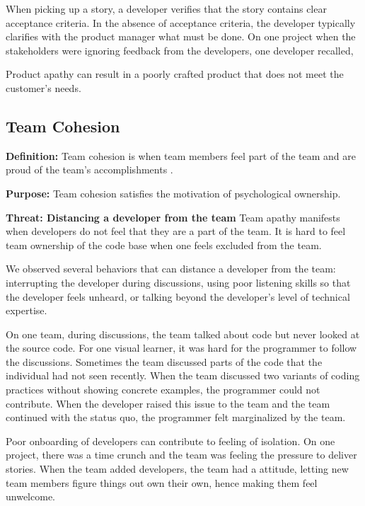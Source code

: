 When picking up a story, a developer verifies that the story contains clear acceptance criteria. In the absence of acceptance criteria, the developer typically clarifies with the product manager what must be done. On one project when the stakeholders were ignoring feedback from the developers, one developer recalled,  

Product apathy can result in a poorly crafted product that does not meet the customer's needs.

\subsection{Team Cohesion}
\textbf{Definition:} Team cohesion is when team members feel part of the team and are proud of the team's accomplishments \cite{Bollen1990Perceived, Beal2003Cohesion, Whitworth2007Motivation}.

\textbf{Purpose:} Team cohesion satisfies the  motivation of psychological ownership.

\textbf{Threat: Distancing a developer from the team} Team apathy manifests when developers do not feel that they are a part of the team. It is hard to feel team ownership of the code base when one feels excluded from the team.

We observed several behaviors that can distance a developer from the team: interrupting the developer during discussions, using poor listening skills so that the developer feels unheard, or talking beyond the developer's level of technical expertise. 

On one team, during discussions, the team talked about code but never looked at the source code. For one visual learner, it was hard for the programmer to follow the discussions. Sometimes the team discussed parts of the code that the individual had not seen recently. When the team discussed two variants of coding practices without showing concrete examples, the programmer could not contribute. When the developer raised this issue to the team and the team continued with the status quo, the programmer felt marginalized by the team.

Poor onboarding of developers can contribute to feeling of isolation. On one project, there was a time crunch and the team was feeling the pressure to deliver stories. When the team added developers, the team had a  attitude, letting new team members figure things out own their own, hence making them feel unwelcome.


